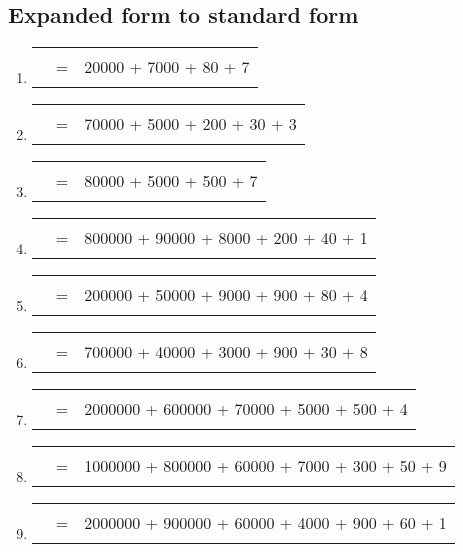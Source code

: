 \documentclass[11pt]{article}
\begin{document}
\subsection{Expanded form to standard form}
\begin{enumerate}
    \item \begin{tabular}{rcl} \rule[-5pt]{7em}{0.4pt} & = & 20000 + 7000 + 80 + 7 \end{tabular}
    \item \begin{tabular}{rcl} \rule[-5pt]{7em}{0.4pt} & = & 70000 + 5000 + 200 + 30 + 3 \end{tabular}
    \item \begin{tabular}{rcl} \rule[-5pt]{7em}{0.4pt} & = & 80000 + 5000 + 500 + 7 \end{tabular}
    \item \begin{tabular}{rcl} \rule[-5pt]{7em}{0.4pt} & = & 800000 + 90000 + 8000 + 200 + 40 + 1 \end{tabular}
    \item \begin{tabular}{rcl} \rule[-5pt]{7em}{0.4pt} & = & 200000 + 50000 + 9000 + 900 + 80 + 4 \end{tabular}
    \item \begin{tabular}{rcl} \rule[-5pt]{7em}{0.4pt} & = & 700000 + 40000 + 3000 + 900 + 30 + 8 \end{tabular}
    \item \begin{tabular}{rcl} \rule[-5pt]{7em}{0.4pt} & = & 2000000 + 600000 + 70000 + 5000 + 500 + 4 \end{tabular}
    \item \begin{tabular}{rcl} \rule[-5pt]{7em}{0.4pt} & = & 1000000 + 800000 + 60000 + 7000 + 300 + 50 + 9 \end{tabular}
    \item \begin{tabular}{rcl} \rule[-5pt]{7em}{0.4pt} & = & 2000000 + 900000 + 60000 + 4000 + 900 + 60 + 1 \end{tabular}
\end{enumerate}
\end{document}
